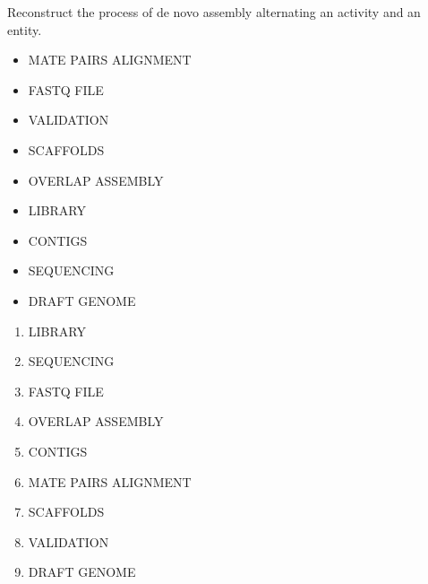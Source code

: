 \begin{Exercise} [
  label={ex24},
  origin={G. Valle}
 ]

\Question Reconstruct the process of de novo assembly alternating an activity
and an entity.
\begin{itemize}
\item MATE PAIRS ALIGNMENT
\item FASTQ FILE
\item VALIDATION
\item SCAFFOLDS
\item OVERLAP ASSEMBLY
\item LIBRARY
\item CONTIGS
\item SEQUENCING
\item DRAFT GENOME
\end{itemize}

\end{Exercise}

\begin{Answer} [
  ref={ex24},
  number={1}
 ]

\Question 
\begin{enumerate}
\item LIBRARY
\item SEQUENCING
\item FASTQ FILE
\item OVERLAP ASSEMBLY
\item CONTIGS
\item MATE PAIRS ALIGNMENT
\item SCAFFOLDS
\item VALIDATION
\item DRAFT GENOME
\end{enumerate}

\end{Answer}

